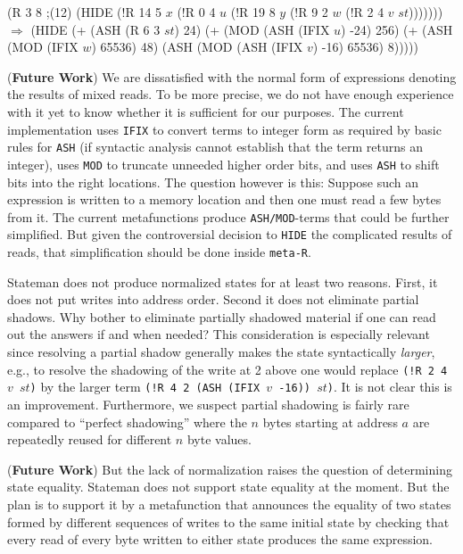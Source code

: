 \documentclass[submission,copyright,creativecommons]{eptcs}
\newcommand{\ptt}[1]{\tt{#1}}
\begin{document}
\begin{acl2p}
(R 3 8                                                                ;{\rm{(12)}}
   (HIDE 
    (!R 14 5 $x$
        (!R 0 4 $u$ 
            (!R 19 8 $y$
                (!R 9 2 $w$
                    (!R 2 4 $v$ $st$)))))))
$\Longrightarrow$
(HIDE (+ (ASH (R 6 3 $st$) 24)
         (+ (MOD (ASH (IFIX $u$) -24) 256)
            (+ (ASH (MOD (IFIX $w$) 65536) 48)
               (ASH (MOD (ASH (IFIX $v$) -16) 65536) 8)))))
\end{acl2p}
({\bf{Future Work}}) We are dissatisfied with the normal form of expressions
denoting the results of mixed reads.  To be more precise, we do not have
enough experience with it yet to know whether it is sufficient for our
purposes.  The current implementation uses {\ptt{IFIX}} to convert terms to
integer form as required by basic rules for {\ptt{ASH}} (if syntactic
analysis cannot establish that the term returns an integer), uses {\ptt{MOD}}
to truncate unneeded higher order bits, and uses {\ptt{ASH}} to shift bits
into the right locations.  The question however is this: Suppose such an
expression is written to a memory location and then one must read a few bytes
from it.  The current metafunctions produce {\ptt{ASH/MOD}}-terms that could
be further simplified.  But given the controversial decision to {\ptt{HIDE}} the
complicated results of reads, that simplification should be done inside
{\ptt{meta-R}}.

Stateman does not produce normalized states for at least two reasons.
First, it does not put writes into address order.  Second it does not
eliminate partial shadows.  Why bother to eliminate partially shadowed
material if one can read out the answers if and when needed?  This
consideration is especially relevant since resolving a partial shadow
generally makes the state syntactically {\em{larger}}, e.g., to resolve the
shadowing of the write at 2 above one would replace {\ptt{(!R 2 4 $v$ $st$)}}
by the larger term {\ptt{(!R 4 2 (ASH (IFIX $v$ -16)) $st$)}}.  It is not
clear this is an improvement.  Furthermore, we suspect partial shadowing is
fairly rare compared to ``perfect shadowing'' where the $n$ bytes starting at
address $a$ are repeatedly reused for different $n$ byte values.


({\bf{Future Work}}) But the lack of normalization raises the question of
determining state equality.  Stateman does not support state equality at the
moment.  But the plan is to support it by a metafunction that announces the
equality of two states formed by different sequences of writes to the same
initial state by checking that every read of every byte written to either
state produces the same expression.
\end{document}
